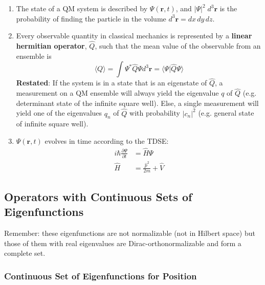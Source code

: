 \begin{enumerate}
    \item The state of a QM system is described by $\Psi(\mathbf{r},t)$, and $|\Psi|^2\; d^3 \mathbf{r}$ is the probability of finding the particle in the volume $d^3 \mathbf{r} = dx\,dy\,dz$.
    \item Every observable quantity in classical mechanics is represented by a \textbf{linear hermitian operator}, $\hat{Q}$, such that the mean value of the observable from an ensemble is
          \noindent\begin{equation*}
              \langle Q\rangle=\int\Psi^{*}\hat{Q}\Psi d^{3} \mathbf{r}= \langle\Psi|\hat{Q}\Psi\rangle
          \end{equation*}\newline
          \textbf{Restated}:\newline
          If the system is in a state that is an eigenstate of $\hat{Q}$, a measurement on a QM ensemble will always yield the eigenvalue $q$ of $\hat{Q}$ (e.g. determinant state of the infinite square well).\newline
          Else, a single measurement will yield one of the eigenvalues $q_n$ of $\hat{Q}$ with probability $|c_n|^2$ (e.g. general state of infinite square well).
    \item $\Psi(\mathbf{r},t)$ evolves in time according to the TDSE:
          \noindent\begin{align*}
              i\hbar \frac{\partial \Psi}{\partial t} & =\hat{H}\Psi                     \\
              \hat{H}                                 & = \frac{\hat{p}^2}{2m} + \hat{V}
          \end{align*}
\end{enumerate}

\subsection{Operators with Continuous Sets of Eigenfunctions}
Remember: these eigenfunctions are not normalizable (not in Hilbert space) but those of them with real eigenvalues are Dirac-orthonormalizable and form a complete set.

\subsubsection{Continuous Set of Eigenfunctions for Position}


